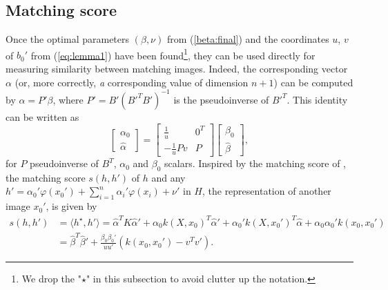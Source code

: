 \subsection{Matching score}
Once the optimal parameters $(\beta, \nu)$ from (\ref{beta:final}) and the coordinates $u$, $v$ of $b_0'$ from (\ref{eq:lemma1}) have been found\footnote{We drop the "$\star$" in this subsection to avoid clutter up the notation.}, they can be used directly for measuring similarity between matching images. 
Indeed, the corresponding vector $\alpha$ (or, more correctly, \textit{a} corresponding value of dimension $n+1$) can be computed by $\alpha = P'\beta$, where $P'=B'(B'^TB')^{-1}$  is the pseudoinverse of $B'^T$. This identity can be written as 
\begin{equation}
\begin{bmatrix} \alpha_0 \\ \hat{\alpha} \end{bmatrix} = \begin{bmatrix} \frac{1}{u} & 0^T \\-\frac{1}{u}Pv & P  \end{bmatrix} \begin{bmatrix}\beta_0 \\ \hat{\beta} \end{bmatrix},
\end{equation}
for $P$ pseudoinverse of $B^T$, $\alpha_0$ and $\beta_0$ scalars.
Inspired by the matching score of \cite{ZePe15}, the matching score $s(h,h')$ of $h$ and any $h'=\alpha_0'\varphi(x_0')+\sum_{i=1}^n \alpha_i'\varphi (x_i)+\nu'$ in $H$, the representation of another image $x_0'$, is given by 
\begin{align}
 s(h,h') &= \langle h^\star, h'\rangle= \hat{\alpha}^{T} K\hat{\alpha}'+\alpha_0k(X, x_0)^T\hat{\alpha}'+\alpha_0'k(X, x_0')^T\hat{\alpha}+\alpha_0\alpha_0'k(x_0,x_0')\\
 &=
\hat{\beta}^T\hat{\beta}'+\frac{\beta_0\beta_0'}{uu'}(k(x_0,x_0')-v^Tv').
\end{align}



